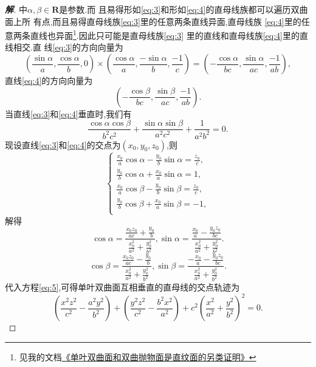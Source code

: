 \documentclass[a4paper]{article}
\begin{document}
\begin{proof}[\textbf{解}]
中$\alpha,\beta\in \mathbf{R}$是参数.而
且易得形如\eqref{eq:3}和形如\eqref{eq:4}的直母线族都可以遍历双曲面上所
有点,而且易得直母线族\eqref{eq:3}里的任意两条直线异面,直母线族
\eqref{eq:4}里的任意两条直线也异面\footnote{见我的文档\href{http://blog.sciencenet.cn/home.php?mod=space&uid=604208&do=blog&id=833256}{《单叶双曲面和双曲抛物面是直纹面的另类证明》}}.因此只可能是直母线族\eqref{eq:3}
里的直线和直母线族\eqref{eq:4}里的直线相交.直
线\eqref{eq:3}的方向向量为
$$
(\frac{\sin\alpha}{a},\frac{\cos\alpha}{b},0)\times (\frac{\cos\alpha}{a},\frac{-\sin\alpha}{b},\frac{-1}{c})=(-\frac{\cos\alpha}{bc},\frac{\sin\alpha}{ac},\frac{-1}{ab}),
$$
直线\eqref{eq:4}的方向向量为
$$
(-\frac{\cos\beta}{bc},\frac{\sin\beta}{ac},\frac{-1}{ab}).
$$
当直线\eqref{eq:3}和\eqref{eq:4}垂直时,我们有
\begin{equation}
  \label{eq:5}
  \frac{\cos\alpha\cos\beta}{b^2c^2}+\frac{\sin\alpha\sin\beta}{a^2c^2}+\frac{1}{a^2b^2}=0.
\end{equation}
现设直线\eqref{eq:3}和\eqref{eq:4}的交点为$(x_0,y_0,z_0)$,则$$
\begin{cases}
\frac{x_0}{a}\cos\alpha-\frac{y_0}{b}\sin\alpha=\frac{z_0}{c},\\
\frac{y_0}{b}\cos\alpha+\frac{x_0}{a}\sin\alpha=1,\\
\frac{x_0}{a}\cos\beta-\frac{y_0}{b}\sin\beta=\frac{z_0}{c},\\
\frac{y_0}{b}\cos\beta+\frac{x_0}{a}\sin\beta=-1,\\
\end{cases}
$$
解得
$$
\cos\alpha=\frac{\frac{x_0z_0}{ac}+\frac{y_0}{b}}{\frac{x_0^2}{a^2}+\frac{y_0^2}{b^2}},\sin\alpha=\frac{\frac{x_0}{a}-\frac{y_0z_0}{bc}}{\frac{x_0^2}{a^2}+\frac{y_0^2}{b^2}}.
$$
$$
\cos\beta=\frac{\frac{x_0z_0}{ac}-\frac{y_0}{b}}{\frac{x_0^2}{a^2}+\frac{y_0^2}{b^2}},\sin\beta=\frac{-\frac{x_0}{a}-\frac{y_0z_0}{bc}}{\frac{x_0^2}{a^2}+\frac{y_0^2}{b^2}}.
$$
代入方程\eqref{eq:5},可得单叶双曲面互相垂直的直母线的交点轨迹为
$$
(\frac{x^2z^2}{c^2}-\frac{a^{2}y^2}{b^2})+(\frac{y^2z^2}{c^2}-\frac{b^{2}x^2}{a^2})+c^2(\frac{x^2}{a^2}+\frac{y^2}{b^2})^2=0.
$$
\end{proof}
\end{document}
